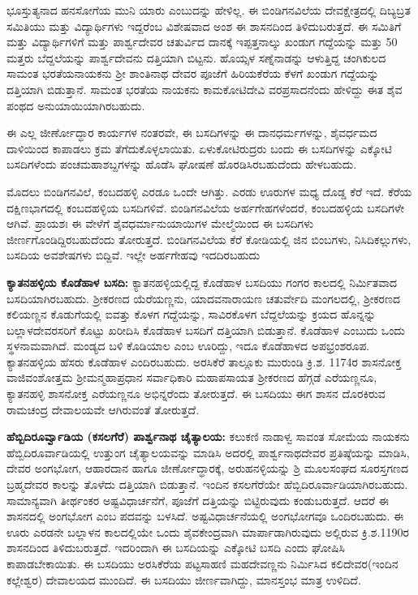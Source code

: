 ಭೂಸ್ತುತ್ಯನಾದ ಹನಸೋಗೆಯ ಮುನಿ ಯಾರು ಎಂಬುದನ್ನು ಹೇಳಿಲ್ಲ. ಈ ಬಿಂಡಿಗನವಿಲೆಯ ದೇವಕ್ಷೇತ್ರದಲ್ಲಿ ದಿಬ್ಯಬ್ರತ ಸಮಿತಿಯು ಮತ್ತು ವಿದ್ಯಾರ್ಥಿಗಳು ಇದ್ದರೆಂಬ ವಿಶೇಷವಾದ ಅಂಶ ಈ ಶಾಸನದಿಂದ ತಿಳಿದುಬರುತ್ತದೆ. ಈ ಸಮಿತಿಗೆ ಮತ್ತು ವಿದ್ಯಾರ್ಥಿಗಳಿಗೆ ಮತ್ತು ಪಾರ್ಶ್ವದೇವರ ಚತುರ್ವಿದ ದಾನಕ್ಕೆ ಇಪ್ಪತ್ತನಾಲ್ಕು ಖಂಡುಗ ಗದ್ದೆಯನ್ನು ಮತ್ತು 50 ಮತ್ತರು ಬೆದ್ದಲೆಯನ್ನು ಪಾರ್ಶ್ವದೇವನು ದತ್ತಿಯಾಗಿ ಬಿಟ್ಟನು. ಹೊಯ್ಸಳ ಸಣ್ನೆನಾಡನ್ನು ಆಳುತ್ತಿದ್ದ ಚಂಗಿಕುಲದ ಸಾಮಂತ ಭರತೆಯನಾಯಕನು ಶ‍್ರೀ ಶಾಂತಿನಾಥ ದೇವರ ಪೂಜೆಗೆ ಹಿರಿಯಕೆರೆಯ ಕೆಳಗೆ ಖಂಡುಗ ಗದ್ದೆಯನ್ನು ದತ್ತಿಯಾಗಿ ಬಿಡುತ್ತಾನೆ. ಸಾಮಂತ ಭರತೆಯ ನಾಯಕನು ಕಾಮಕೋಟಿದೇವಿ ವರಪ್ರಸಾದನೆಂದು ಹೇಳಿದ್ದು ಈತ ಶೈವ ಪಂಥದ ಅನುಯಾಯಿಯಾಗಿರಬಹುದು.

ಈ ಎಲ್ಲ ಜೀರ್ಣೋದ್ಧಾರ ಕಾರ್ಯಗಳ ನಂತರವೇ, ಈ ಬಸದಿಗಳನ್ನು ಈ ದಾನಧರ್ಮಗಳನ್ನು, ಶೈವರ್ಧಮದ ದಾಳಿಯಿಂದ ಕಾಪಾಡಲು ಕ್ರಮ ತೆಗೆದುಕೊಳ್ಳಲಾಯಿತು. ಏಳುಕೋಟಿರುದ್ರರು ಬಂದು ಈ ಬಸದಿಗಳನ್ನು ಎಕ್ಕೋಟಿ ಬಸದಿಗಳೆಂದು ಪಂಚಮಹಾಶಬ್ದಗಳನ್ನು ಹೊಡೆಸಿ ಘೋಷಣೆ ಹೊರಡಿಸಿರಬಹುದೆಂದು ಹೇಳಬಹುದು.

ಮೊದಲು ಬಿಂಡಿಗನವಿಲೆ, ಕಂಬದಹಳ್ಳಿ ಎರಡೂ ಒಂದೇ ಆಗಿತ್ತು. ಎರಡು ಊರುಗಳ ಮಧ್ಯ ದೊಡ್ಡ ಕೆರೆ ಇದೆ. ಕೆರೆಯ ದಕ್ಷಿಣಭಾಗದಲ್ಲಿ ಕಂಬದಹಳ್ಳಿಯ ಬಸದಿಗಳಿವೆ. ಬಿಂಡಿಗನವಿಲೆಯ ಅರ್ಹಗೇಹಗಳೆಂದರೆ, ಕಂಬದಹಳ್ಳಿಯ ಬಸದಿಗಳೇ ಆಗಿವೆ. ಪ್ರಾಯಶಃ ಈ ವೇಳೆಗೆ ಶೈವಧರ್ಮಾನುಯಾಯಿಗಳ ಮೇಲ್ಮೆಯಿಂದ ಈ ಬಸದಿಗಳು ಜೀರ್ಣಗೊಂಡಿದ್ದಿರಬಹುದೆಂದು ತೋರುತ್ತದೆ. ಬಿಂಡಿಗನವಿಲೆಯ ಕೆರೆ ಕೋಡಿಯಲ್ಲಿ ಜಿನ ಬಿಂಬಗಳು, ನಿಸಿದಿಕಲ್ಲುಗಳು, ಬಸದಿಯ ಅವಶೇಷಗಳು ಬಿದ್ದಿವೆ. ಇಲ್ಲೇ ಅರ್ಹಗೇಹವು ಇದದಿರಬಹುದು

\textbf{ಕ್ಯಾತನಹಳ್ಳಿಯ ಕೊಡೆಹಾಳ ಬಸದಿ:} ಕ್ಯಾತನಹಳ್ಳಿಯಲ್ಲಿದ್ದ ಕೊಡೆಹಾಳ ಬಸದಿಯು ಗಂಗರ ಕಾಲದಲ್ಲಿ ನಿರ್ಮಿತವಾದ ಬಸದಿಯಾಗಿರಬಹುದು. ಶ‍್ರೀಕರಣದ ಯೆರೆಯಣ್ಣನು, ಯಾದವನಾರಾಯಣ ಚತುರ್ವೇದಿ ಮಂಗಲದಲ್ಲಿ, ಶ‍್ರೀಕರಣದ ಕಲಿಯಣ್ಣನ ಕೊಡುಗೆಯಲ್ಲಿ ಐವತ್ತು ಕೊಳಗ ಗದ್ದೆಯನ್ನು, ಸಾವಿರಕೊಳಗ ಬೆದ್ದಲೆಯನ್ನು ಕ್ರಯದ ಹೊನ್ನನ್ನು ಬಲ್ಲಾಳದೇವರಸರಿಗೆ ಕೊಟ್ಟು ಖರೀದಿಸಿ ಕೊಡೆಹಾಳ ಬಸದಿಗೆ ದತ್ತಿಯಾಗಿ ಬಿಡುತ್ತಾನೆ. ಕೊಡೆಹಾಳ ಎಂಬುದು ಒಂದು ಸ್ಥಳನಾಮವಾಗಿದೆ. ಮಂಡ್ಯದ ಬಳಿ ಕೊಡಿಯಾಲ ಎಂಬ ಊರಿದ್ದು, ಇದೂ ಕೊಡೆಹಾಳದ ಅಪಭ್ರಂಶರೂಪ. ಕ್ಯಾತನಹಳ್ಳಿಯ ಹೆಸರು ಕೊಡೆಹಾಳ ಎಂದಿರಬಹುದು. ಅರಸಿಕೆರೆ ತಾಲ್ಲೂಕು ಮುರುಂಡಿ ಕ್ರಿ.ಶ. 1174ರ ಶಾಸನೋಕ್ತ ವಾಜಿವಂಶೋತ್ತಮ ಶ‍್ರೀಮನ್ಮಹಾಪ್ರಧಾನ ಸರ್ವಾಧಿಕಾರಿ ಮಹಾಪಸಾಯತ ಶ‍್ರೀಕರಣದ ಹೆಗ್ಗಡೆ ಎರೆಯಣ್ಣನೂ, ಕ್ಯಾತನಹಳ್ಳಿ ಶಾಸನೋಕ್ತ ಎರೆಯಣ್ಣನೂ ಅಭಿನ್ನರೆಂದು ತೋರುತ್ತದೆ. ಈ ಬಸದಿಯು ಈಗ ಶಾಸನ ದೊರಕಿರುವ ರಾಮಚಂದ್ರ ದೇವಾಲಯವೇ ಆಗಿರುವಂತೆ ತೋರುತ್ತದೆ. 

\textbf{ಹೆಬ್ಬಿದಿರೂರ್ವ್ವಾಡಿಯ (ಕಸಲಗೆರೆ) ಪಾರ್ಶ್ವನಾಥ ಚೈತ್ಯಾಲಯ:} ಕಲುಕಣಿ ನಾಡಾಳ್ವ ಸಾವಂತ ಸೋಮೆಯ ನಾಯಕನು ಹೆಬ್ಬಿದಿರೂರ್ವಾಡಿಯಲ್ಲಿ ಉತ್ತುಂಗ ಚೈತ್ಯಾಲಯವನ್ನು ಮಾಡಿಸಿ ಅದರಲ್ಲಿ ಪಾರ್ಶ್ವನಾಥದೇವರ ಪ್ರತಿಷ್ಠೆಯನ್ನು ಮಾಡಿಸಿ, ದೇವರ ಅಂಗಭೋಗ, ಆಹಾರದಾನ ಹಾಗೂ ಜೀರ್ಣೋದ್ಧಾರಕ್ಕೆ, ಅರುಹನಳ್ಳಿಯನ್ನು ಶ್ರಿ ಮೂಲಸಂಘದ ಸೂರಸ್ತಗಣದ ಬ್ರಹ್ಮದೇವರ ಕಾಲನ್ನು ತೊಳೆದು ದತ್ತಿಯಾಗಿ ಬಿಡುತ್ತಾನೆ. ಇಂದಿನ ಕಸಲಗೆರೆಯೇ ಹೆಬ್ಬಿದಿರೂರ್ವಾಡಿಯಾಗಿರಬಹುದು. ಸಾಮಾನ್ಯವಾಗಿ ತೀರ್ಥಂಕರ ಅಷ್ಟವಿಧಾರ್ಚನೆಗೆ, ಪೂಜೆಗೆ ದತ್ತಿಯನ್ನು ಬಿಟ್ಟಿರುವುದು ಕಂಡುಬರುತ್ತದೆ. ಆದರೆ ಈ ಶಾಸನದಲ್ಲಿ ಅಂಗಭೋಗ ಎಂಬ ಪದವನ್ನು ಬಳಸಿದೆ. ಅಷ್ಟವಿಧಾರ್ಚನೆಯಲ್ಲಿ ಅಂಗಭೋಗವೂ ಒಂದಿರಬಹುದು. ಈ ಊರು ಎರಡನೇ ಬಲ್ಲಾಳನ ಕಾಲದಲ್ಲಿಯೇ ಒಂದು ಶೈವಕೇಂದ್ರವಾಗಿ ಮಾರ್ಪಾಡಾಗಿರುವುದು ಅಲ್ಲಿರುವ ಕ್ರಿ.ಶ.1190ರ ಶಾಸನದಿಂದ ತಿಳಿದುಬರುತ್ತದೆ. ಇದರಿಂದಾಗಿ ಈ ಬಸದಿಯನ್ನು ಎಕ್ಕೋಟಿ ಬಸದಿ ಎಂದು ಘೋಷಿಸಿ ಕಾಪಾಡಬೇಕಾಯಿತು. ಈ ಬಸದಿಯು ಅರಸಿಕೆರೆಯ ಪಟ್ಟಸಾಹಣಿ ಮಹದೇವಣ್ಣನು ನಿರ್ಮಿಸಿದ ಕಲಿದೇವರ(ಇಂದಿನ ಕಲ್ಲೇಶ್ವರ) ದೇವಾಲಯದ ಮುಂದಿದೆ. ಈ ಬಸದಿಯು ಜೀರ್ಣವಾಗಿದ್ದು, ಮಾನಸ್ತಂಭ ಮಾತ್ರ ಉಳಿದಿದೆ. 

